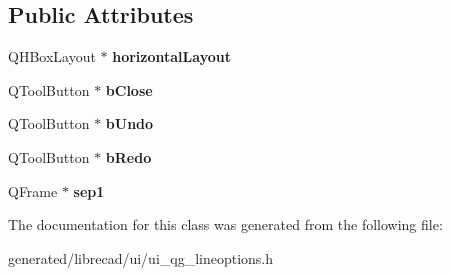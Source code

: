 \subsection*{Public Attributes}
\begin{DoxyCompactItemize}
\item 
\hypertarget{classUi__QG__LineOptions_a6265e461116efbd667f0e3ef673bc34e}{Q\-H\-Box\-Layout $\ast$ {\bfseries horizontal\-Layout}}\label{classUi__QG__LineOptions_a6265e461116efbd667f0e3ef673bc34e}

\item 
\hypertarget{classUi__QG__LineOptions_a7273644a7f8d9b6708d15dddc21539c4}{Q\-Tool\-Button $\ast$ {\bfseries b\-Close}}\label{classUi__QG__LineOptions_a7273644a7f8d9b6708d15dddc21539c4}

\item 
\hypertarget{classUi__QG__LineOptions_acca2a88c7758a584eda52903e15eeb90}{Q\-Tool\-Button $\ast$ {\bfseries b\-Undo}}\label{classUi__QG__LineOptions_acca2a88c7758a584eda52903e15eeb90}

\item 
\hypertarget{classUi__QG__LineOptions_a0655080fedb5137378d9d129c9d20ca3}{Q\-Tool\-Button $\ast$ {\bfseries b\-Redo}}\label{classUi__QG__LineOptions_a0655080fedb5137378d9d129c9d20ca3}

\item 
\hypertarget{classUi__QG__LineOptions_a03c4d5e7f59593279d9a7464da2bb47d}{Q\-Frame $\ast$ {\bfseries sep1}}\label{classUi__QG__LineOptions_a03c4d5e7f59593279d9a7464da2bb47d}

\end{DoxyCompactItemize}


The documentation for this class was generated from the following file\-:\begin{DoxyCompactItemize}
\item 
generated/librecad/ui/ui\-\_\-qg\-\_\-lineoptions.\-h\end{DoxyCompactItemize}

